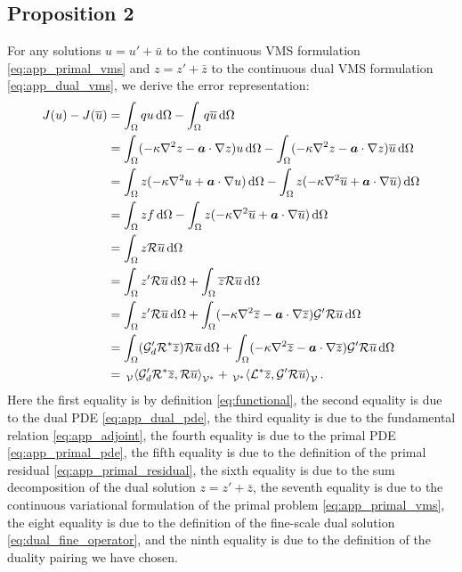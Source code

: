 \subsection{Proposition 2}
For any solutions $u = u' + \bar{u}$ to the continuous VMS
formulation \eqref{eq:app_primal_vms} and $z = z' + \bar{z}$ to the
continuous dual VMS formulation \eqref{eq:app_dual_vms}, we
derive the error representation:
%
\begin{gather*}
\begin{aligned}
J(u) - J(\overline{u})
&=
\int_{\Omega} q u \, \text{d} \Omega -
\int_{\Omega} q \overline{u} \, \text{d} \Omega \\
&=
\int_{\Omega} (-\kappa \nabla^2 {z} - \boldsymbol{a} \cdot \nabla {z}) u \, \text{d} \Omega -
\int_{\Omega} (-\kappa \nabla^2 {z} - \boldsymbol{a} \cdot \nabla {z}) \overline{u} \, \text{d} \Omega \\
&=
\int_{\Omega} z (-\kappa \nabla^2 {u} + \boldsymbol{a} \cdot \nabla {u}) \, \text{d} \Omega -
\int_{\Omega} z (-\kappa \nabla^2 {\overline{u}} + \boldsymbol{a} \cdot \nabla {\overline{u}}) \, \text{d} \Omega \\
&=
\int_{\Omega} z f \, \text{d} \Omega -
\int_{\Omega} z (-\kappa \nabla^2 {\overline{u}} + \boldsymbol{a} \cdot \nabla {\overline{u}}) \, \text{d} \Omega \\
&=
\int_{\Omega} z \mathcal{R} \overline{u} \, \text{d} \Omega \\
&=
\int_{\Omega} z' \mathcal{R} \overline{u} \, \text{d} \Omega +
\int_{\Omega} \overline{z} \mathcal{R} \overline{u} \, \text{d} \Omega \\
&=
\int_{\Omega} z' \mathcal{R} \overline{u} \, \text{d} \Omega +
\int_{\Omega} (-\kappa \nabla^2 {\overline{z}} - \boldsymbol{a} \cdot \nabla {\overline{z}}) \mathcal{G}' \mathcal{R} \overline{u} \, \text{d} \Omega \\
&=
\int_{\Omega} (\mathcal{G}'_d \mathcal{R}^* \overline{z}) \mathcal{R} \overline{u} \, \text{d} \Omega +
\int_{\Omega} (-\kappa \nabla^2 {\overline{z}} - \boldsymbol{a} \cdot \nabla {\overline{z}}) \mathcal{G}' \mathcal{R} \overline{u} \, \text{d} \Omega \\
&=
\,{}_{\mathcal{V}}^{}\!\left< {\mathcal{G}'_d \mathcal{R}^* \overline{z}}, {\mathcal{R} \overline{u}} \right>_{\mathcal{V}^*} +
\,{}_{\mathcal{V}^*}^{}\!\left< {\mathcal{L}^* \overline{z}}, {\mathcal{G}' \mathcal{R} \overline{u}} \right>_{\mathcal{V}}.
\end{aligned}
\label{eq:app_error_cont_2}
\end{gather*}
Here the first equality is by definition \eqref{eq:functional},
the second equality is due to the dual PDE \eqref{eq:app_dual_pde},
the third equality is due to the fundamental relation
\eqref{eq:app_adjoint}, the fourth equality is due to the primal
PDE \eqref{eq:app_primal_pde}, the fifth equality is due to the
definition of the primal residual \eqref{eq:app_primal_residual},
the sixth equality is due to the sum decomposition of the
dual solution $z = z' + \bar{z}$, the seventh equality is due
to the continuous variational formulation of the primal problem
\eqref{eq:app_primal_vms}, the eight equality is due to
the definition of the fine-scale dual solution
\eqref{eq:dual_fine_operator}, and the ninth equality
is due to the definition of the duality pairing we have chosen.

